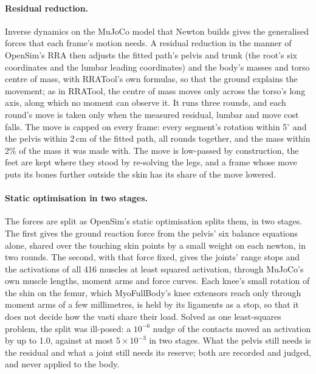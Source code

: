 \documentclass[11pt]{article}
\newcommand{\dg}{\ensuremath{^\circ}}
\begin{document}
\paragraph{Residual reduction.} Inverse dynamics on the MuJoCo model that Newton builds gives the generalised forces
that each frame's motion needs. A residual reduction in the manner of OpenSim's RRA \cite{delp2007opensim} then adjusts
the fitted path's pelvis and trunk (the root's six coordinates and the lumbar leading coordinates) and the body's
masses and torso centre of mass, with RRATool's own formulas, so that the ground explains the movement; as in
RRATool, the centre of mass moves only across the torso's long axis, along which no moment can observe it. It runs three
rounds, and each round's move is taken only when the measured residual, lumbar and move cost falls. The move is
capped on every frame: every segment's rotation within 5\dg{} and the pelvis within 2\,cm of the fitted path, all
rounds together, and the mass within 2\% of the mass it was made with. The move is low-passed by construction, the
feet are kept where they stood by re-solving the legs, and a frame whose move puts its bones further outside the skin
has its share of the move lowered.

\paragraph{Static optimisation in two stages.} The forces are split as OpenSim's static optimisation splits them, in
two stages. The first gives the ground reaction force from the pelvis' six balance equations alone, shared over the
touching skin points by a small weight on each newton, in two rounds. The second, with that force fixed, gives the
joints' range stops and the activations of all 416 muscles at least squared activation, through MuJoCo's own muscle
lengths, moment arms and force curves. Each knee's small rotation of the shin on the femur, which MyoFullBody's knee
extensors reach only through moment arms of a few millimetres, is held by its ligaments as a stop, so that it does not
decide how the vasti share their load. Solved as one least-squares problem, the split was ill-posed: a $10^{-6}$ nudge
of the contacts moved an activation by up to 1.0, against at most $5\times10^{-3}$ in two stages. What the pelvis still
needs is the residual and what a joint still needs its reserve; both are recorded and judged, and never applied to the
body.
\end{document}

